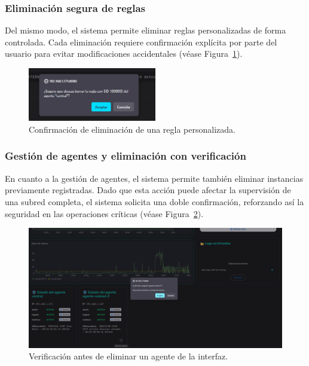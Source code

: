 \documentclass[11pt,a4paper,twoside]{report}
\begin{document}
\subsubsection{Eliminación segura de reglas}

Del mismo modo, el sistema permite eliminar reglas personalizadas de forma controlada. Cada eliminación requiere confirmación explícita por parte del usuario para evitar modificaciones accidentales (véase Figura~\ref{fig:eliminar_regla}).

\begin{figure}[H]
	\centering
	\includegraphics[width=0.5\textwidth]{pruebas/7.png}
	\caption{Confirmación de eliminación de una regla personalizada.}
	\label{fig:eliminar_regla}
\end{figure}

\subsubsection{Gestión de agentes y eliminación con verificación}

En cuanto a la gestión de agentes, el sistema permite también eliminar instancias previamente registradas. Dado que esta acción puede afectar la supervisión de una subred completa, el sistema solicita una doble confirmación, reforzando así la seguridad en las operaciones críticas (véase Figura~\ref{fig:eliminar_agente}).

\begin{figure}[H]
	\centering
	\includegraphics[width=1\textwidth]{pruebas/8.png}
	\caption{Verificación antes de eliminar un agente de la interfaz.}
	\label{fig:eliminar_agente}
\end{figure}
\end{document}
